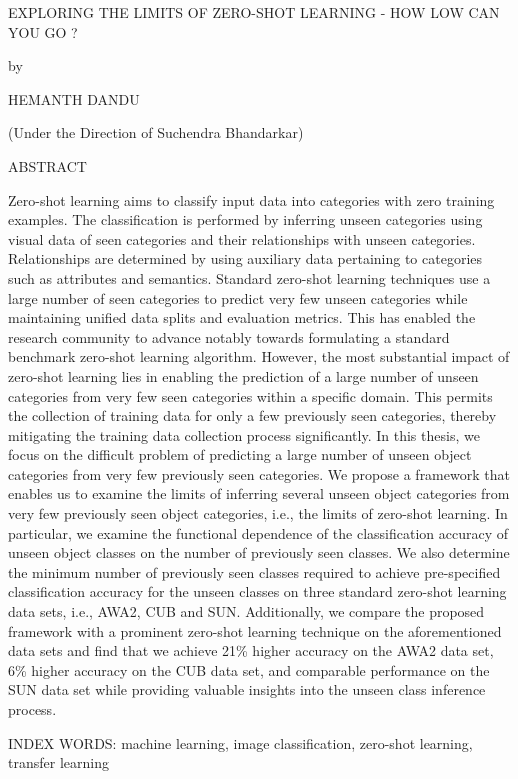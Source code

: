 \thispagestyle{empty}
\begin{center}
    EXPLORING THE LIMITS OF ZERO-SHOT LEARNING - HOW LOW CAN YOU GO ?
    
    by
    
    HEMANTH DANDU
    
    (Under the Direction of Suchendra Bhandarkar)
    
    ABSTRACT
\end{center}
Zero-shot learning aims to classify input data into categories with zero training examples. The classification is performed by inferring unseen categories using visual data of seen categories and their relationships with unseen categories. Relationships are determined by using auxiliary data pertaining to categories such as attributes and semantics. Standard zero-shot learning techniques use a large number of seen categories to predict very few unseen categories while maintaining unified data splits and evaluation metrics. This has enabled the research community to advance notably towards formulating a standard benchmark zero-shot learning algorithm. However, the most substantial impact of zero-shot learning lies in enabling the prediction of a large number of unseen categories from very few seen categories within a specific domain. This permits the collection of training data for only a few previously seen categories, thereby mitigating the training data collection process significantly. In this thesis, we focus on the difficult problem of predicting a large number of unseen object categories from very few previously seen categories. We propose a framework that enables us to examine the limits of inferring several unseen object categories from very few previously seen object categories, i.e., the limits of zero-shot learning. In particular, we examine the functional dependence of the classification accuracy of unseen object classes on the number of previously seen classes. We also determine the minimum number of previously seen classes required to achieve pre-specified classification accuracy for the unseen classes on three standard zero-shot learning data sets, i.e., AWA2, CUB and SUN. Additionally, we compare the proposed framework with a prominent zero-shot learning technique on the aforementioned data sets and find that we achieve 21\% higher accuracy on the AWA2 data set, 6\% higher accuracy on the CUB data set, and comparable performance on the SUN data set while providing valuable insights into the unseen class inference process.

\noindent
INDEX WORDS: machine learning, image classification, zero-shot learning, transfer learning

\newpage